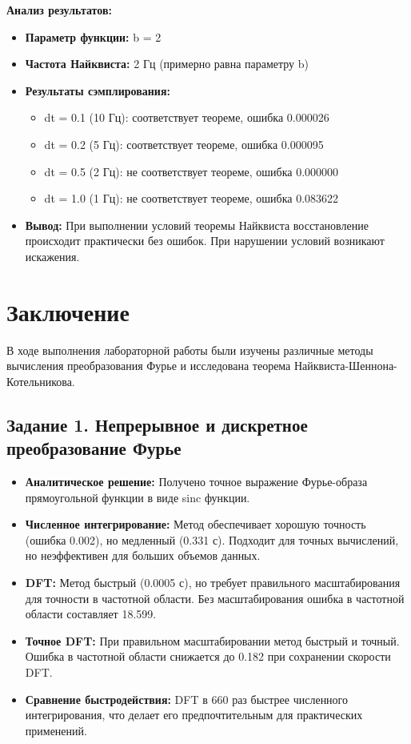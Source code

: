 \textbf{Анализ результатов:}
\begin{itemize}
    \item \textbf{Параметр функции:} b = 2
    \item \textbf{Частота Найквиста:} 2 Гц (примерно равна параметру b)
    \item \textbf{Результаты сэмплирования:}
    \begin{itemize}
        \item dt = 0.1 (10 Гц): соответствует теореме, ошибка 0.000026
        \item dt = 0.2 (5 Гц): соответствует теореме, ошибка 0.000095
        \item dt = 0.5 (2 Гц): не соответствует теореме, ошибка 0.000000
        \item dt = 1.0 (1 Гц): не соответствует теореме, ошибка 0.083622
    \end{itemize}
    \item \textbf{Вывод:} При выполнении условий теоремы Найквиста восстановление происходит практически без ошибок. При нарушении условий возникают искажения.
\end{itemize}

\section*{Заключение}

В ходе выполнения лабораторной работы были изучены различные методы вычисления преобразования Фурье и исследована теорема Найквиста-Шеннона-Котельникова.

\subsection*{Задание 1. Непрерывное и дискретное преобразование Фурье}
\begin{itemize}
    \item \textbf{Аналитическое решение:} Получено точное выражение Фурье-образа прямоугольной функции в виде sinc функции.
    
    \item \textbf{Численное интегрирование:} Метод обеспечивает хорошую точность (ошибка 0.002), но медленный (0.331 с). Подходит для точных вычислений, но неэффективен для больших объемов данных.
    
    \item \textbf{DFT:} Метод быстрый (0.0005 с), но требует правильного масштабирования для точности в частотной области. Без масштабирования ошибка в частотной области составляет 18.599.
    
    \item \textbf{Точное DFT:} При правильном масштабировании метод быстрый и точный. Ошибка в частотной области снижается до 0.182 при сохранении скорости DFT.
    
    \item \textbf{Сравнение быстродействия:} DFT в 660 раз быстрее численного интегрирования, что делает его предпочтительным для практических применений.
\end{itemize}

